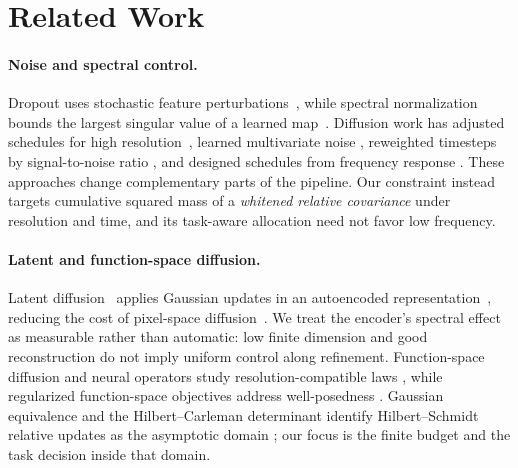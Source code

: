 \section{Related Work}
\label{sec:related-work}

\paragraph{Noise and spectral control.}
Dropout uses stochastic feature perturbations~\citep{srivastava2014dropout},
while spectral normalization bounds the largest singular value of a learned
map~\citep{miyato2018spectral}. Diffusion work has adjusted schedules for high
resolution~\citep{hoogeboom2023simple}, learned multivariate noise
\citep{sahoo2024adaptive}, reweighted timesteps by signal-to-noise ratio
\citep{hang2023minsnr}, and designed schedules from frequency response
\citep{benita2025spectral}. These approaches change complementary parts of the
pipeline. Our constraint instead targets cumulative squared mass of a
\emph{whitened relative covariance} under resolution and time, and its
task-aware allocation need not favor low frequency.

\paragraph{Latent and function-space diffusion.}
Latent diffusion~\citep{rombach2022high} applies Gaussian updates in an
autoencoded representation~\citep{kingma2014autoencoding}, reducing the cost of
pixel-space diffusion~\citep{ho2020denoising}. We treat the encoder's spectral
effect as measurable rather than automatic: low finite dimension and good
reconstruction do not imply uniform control along refinement. Function-space
diffusion and neural operators study resolution-compatible laws
\citep{kerrigan2023diffusion,seidman2023variational}, while regularized
function-space objectives address well-posedness
\citep{cinquin2025well}. Gaussian equivalence and the Hilbert--Carleman
determinant identify Hilbert--Schmidt relative updates as the asymptotic domain
\citep{bogachev1998gaussian,minh2022kullback}; our focus is the finite budget
and the task decision inside that domain.
